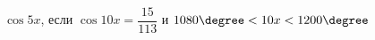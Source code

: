 \begin{ex}[type=simplify_calculate]
	\begin{condition}
		\( \cos5x \), \quad если \( \cos10x=\dfrac{15}{113} \) и \( 1080\degree<10x<1200\degree \)
	\end{condition}
\end{ex}